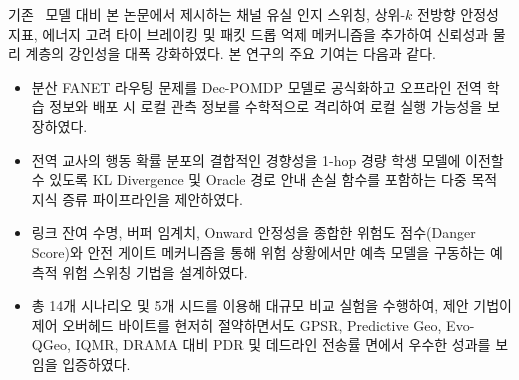 기존 \phaseTwelve\ 모델 대비 본 논문에서 제시하는  채널 유실 인지 스위칭, 상위-$k$ 전방향 안정성 지표, 에너지 고려 타이 브레이킹 및 패킷 드롭 억제 메커니즘을 추가하여 신뢰성과 물리 계층의 강인성을 대폭 강화하였다. 본 연구의 주요 기여는 다음과 같다.
\begin{itemize}
    \item 분산 FANET 라우팅 문제를 Dec-POMDP 모델로 공식화하고 오프라인 전역 학습 정보와 배포 시 로컬 관측 정보를 수학적으로 격리하여 로컬 실행 가능성을 보장하였다.
    \item 전역 교사의 행동 확률 분포의 결합적인 경향성을 1-hop 경량 학생 모델에 이전할 수 있도록 KL Divergence 및 Oracle 경로 안내 손실 함수를 포함하는 다중 목적 지식 증류 파이프라인을 제안하였다.
    \item 링크 잔여 수명, 버퍼 임계치, Onward 안정성을 종합한 위험도 점수(Danger Score)와 안전 게이트 메커니즘을 통해 위험 상황에서만 예측 모델을 구동하는 예측적 위험 스위칭 기법을 설계하였다.
    \item 총 14개 시나리오 및 5개 시드를 이용해 대규모 비교 실험을 수행하여, 제안 기법이 제어 오버헤드 바이트를 현저히 절약하면서도 GPSR, Predictive Geo, Evo-QGeo, IQMR, DRAMA 대비 PDR 및 데드라인 전송률 면에서 우수한 성과를 보임을 입증하였다.
\end{itemize}
